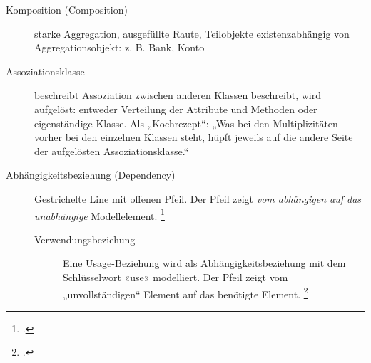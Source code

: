 \documentclass{lehramt-informatik-haupt}
\begin{document}
\begin{description}
%

\item[Komposition (Composition)]

starke Aggregation, ausgefüllte Raute, Teilobjekte existenzabhängig von
Aggregationsobjekt: z. B. Bank, Konto

\begin{center}
\end{center}

\item[Assoziationsklasse]
beschreibt Assoziation zwischen anderen Klassen beschreibt, wird
aufgelöst: entweder Verteilung der Attribute und Methoden oder
eigenständige Klasse. Als „Kochrezept“: „Was bei den Multiplizitäten
vorher bei den einzelnen Klassen steht, hüpft jeweils auf die andere
Seite der aufgelösten Assoziationsklasse.“

\item[Abhängigkeitsbeziehung (Dependency)]

Gestrichelte Line mit offenen Pfeil. Der Pfeil zeigt \emph{vom
abhängigen auf das unabhängige} Modellelement. 
\footcite[Kapitel 6.4.10 Abhängigkeitsbeziehung, Seite 159]{rupp}

\begin{center}
\end{center}

\begin{description}
\item[Verwendungsbeziehung]

Eine Usage-Beziehung wird als Abhängigkeitsbeziehung  mit dem
Schlüsselwort «use» modelliert. Der Pfeil zeigt vom „unvollständigen“
Element auf das benötigte Element.
\footcite[Kapitel 6.4.11 Verwendungsbeziehung, Seite 161]{rupp}

\begin{center}
\end{center}

\end{description}

\end{description}
\end{document}
